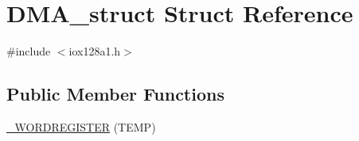 \hypertarget{struct_d_m_a__struct}{
\section{DMA\_\-struct Struct Reference}
\label{struct_d_m_a__struct}
}


{\ttfamily \#include $<$iox128a1.h$>$}

\subsection*{Public Member Functions}
\begin{DoxyCompactItemize}
\item 
\hyperlink{struct_d_m_a__struct_a83df3301004a4b4f784d8928f90b42dd}{\_\-WORDREGISTER} (TEMP)
\end{DoxyCompactItemize}
